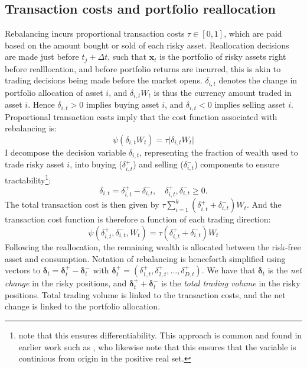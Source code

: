 \documentclass[11pt]{article}
\begin{document}
\subsection{Transaction costs and portfolio reallocation} \label{Subsection: Transaction-costs}
Rebalancing incurs proportional transaction costs \(\tau \in [0,1]\), which are paid based on
the amount bought or sold of each risky asset. 
Reallocation decisions are made just before \(t_j + \Delta t\), such that \( \mathbf{x}_{t} \)
is the portfolio of risky assets right before realllocation, and before portfolio returns are incurred, this is akin to trading decisions being made before the market opens.
\(\delta_{i,t}\) denotes the change in portfolio allocation of asset \( i \),
and \(\delta_{i,t} W_{t}\) is thus the currency amount traded in asset \(i\).
Hence \(\delta_{i,t} >0 \) implies buying asset \(i\), and \(\delta_{i,t} <0 \) implies selling asset \(i\).
Proportional transaction costs imply that the cost function associated with rebalancing is:
\begin{equation} 
  \label{eq:Prop_Transaction_Cost}
  \psi (\delta_{i,t} W_t ) = \tau \lvert \delta_{i,t} W_t \rvert 
\end{equation}
I decompose the decision variable \(\delta_{i,t}\), representing the fraction of wealth used to trade
risky asset \(i\), into buying (\(\delta^+_{i,t}\)) and selling (\(\delta^-_{i,t}\)) components 
to ensure tractability\footnote{\textcite{Scheidegger2023} note that this ensures differentiability.
This approach is common and found in earlier work such as \textcite{Aikan1996}, 
who likewise note that this ensures that the variable is continious from origin in the positive real set.}:
\[
\delta_{i,t} = \delta^+_{i,t} - \delta^-_{i,t}, \quad \delta^+_{i,t}, \delta^-_{i,t} \geq 0.
\]
The total transaction cost is then given by \(\tau \sum_{i=1}^k (\delta^+_{i,t} + \delta^-_{i,t}) W_t\).
And the transaction cost function is therefore a function of each trading direction:
\begin{equation} 
  \label{eq:Prop_Transaction_Cost_Direction}
  \psi (\delta^{+}_{i,t}, \delta^{-}_{i,t} , W_t ) = \tau (\delta^{+}_{i,t} + \delta^{-}_{i,t} ) W_t 
\end{equation}
Following the reallocation, the remaining wealth is allocated between the risk-free asset and consumption.
Notation of rebalancing is henceforth simplified using vectors to \(\boldsymbol{\delta}_t = \boldsymbol{\delta}^+_{t} - \boldsymbol{\delta}^-_{t} \)
with \( \boldsymbol{\delta}^+_{t} = (\delta^{+}_{1,t} ,  \delta^{+}_{2,t} , \ldots ,  \delta^{+}_{D,t} ) \).
We have that \(\boldsymbol{\delta}_t \) is the \textit{net change} in the risky positions, and \(\boldsymbol{\delta}^+_{t} + \boldsymbol{\delta}^-_{t} \) is 
the \textit{total trading volume} in the risky positions. Total trading volume is linked to the transaction costs, and the net change is linked to the portfolio allocation.
\end{document}
